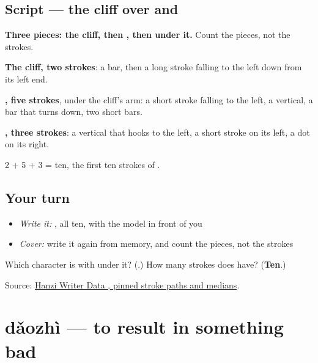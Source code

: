 \subsection*{Script — the cliff over  and }

\begin{quote}
\end{quote}

\textbf{Three pieces: the cliff, then , then  under it.} Count the pieces, not the strokes.

\textbf{The cliff, two strokes}: a bar, then a long stroke falling to the left down from its left end.

\textbf{, five strokes}, under the cliff's arm: a short stroke falling to the left, a vertical, a bar that turns down, two short bars.

\textbf{, three strokes}: a vertical that hooks to the left, a short stroke on its left, a dot on its right.

2 + 5 + 3 = ten, the first ten strokes of .

\subsection*{Your turn}
\begin{itemize}
\raggedright
  \item \emph{Write it:} , all ten, with the model in front of you
  \item \emph{Cover:} write it again from memory, and count the pieces, not the strokes
\end{itemize}

\begin{tcolorbox}[breakable,colback=teal!4,colframe=teal!35!black,title={Before you move on}]
Which character is  with  under it? (\textbf{}.) How many strokes does  have? (\textbf{Ten}.)

Source: \href{https://raw.githubusercontent.com/chanind/hanzi-writer-data/68d10a4b21150cae5e1ebbd223eed289cf32d90c/data/\%E5\%8E\%9F.json}{Hanzi Writer Data , pinned stroke paths and medians}.
\end{tcolorbox}
\section[dǎozhì]{dǎozhì — to result in something bad}


